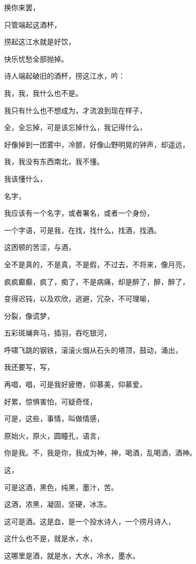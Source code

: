 \documentclass[UTF8]{article}
\begin{document}
\par 换你来罢，
\par 只管端起这酒杯，
\par 捞起这江水就是好饮，
\par 快乐忧愁全部抛掉。
\\[0.6cm]
\par 诗人端起破旧的酒杯，捞这江水，吟：
\\[0.6cm]
\par 我，我，我什么也不是。
\par 我只有什么也不想成为，才流浪到现在样子，
\par 全，全忘掉，可是该忘掉什么，我记得什么，
\par 好像掉到一团雾中，冷颤，好像山野明晃的钟声，却遥远，
\par 我，我没有东西南北，我不懂。
\par 我该懂什么，
\par 名字，
\par 我应该有一个名字，或者署名，或者一个身份，
\par 一个字语，可是我，在找，找什么，找酒，找酒。
\par 这困顿的苦涩，与酒，
\par 全不是真的，不是真，不是假，不过去，不将来，像月亮，
\par 疯疯癫癫，疯了，痴了，不是病痛，却是醉了，醉，醉了，
\par 变得迟钝，以及欢欣，逃避，冗杂，不可理喻，
\par 分裂，像谎梦，
\par 五彩斑斓奔马，插羽，吞吃银河，
\par 呼啸飞跳的钢铁，滚滚火烟从石头的塔顶，鼓动，涌出，
\par 我还要写，写，
\par 再唱，唱，可是我好疲倦，仰慕美，仰慕爱，
\par 好累，惊惧害怕，可疑奇怪，
\par 可是，这些，事情，叫做情感，
\par 原始火，原火，圆瞳孔，语言，
\par 你是我。不，我是你，我成为神，神，喝酒，乱喝酒，酒神。
\par 这，
\par 可是这酒，黑色，纯黑，墨汁，苦。
\par 这酒，浓黑，凝固，坚硬，冰冻。
\par 这可是酒。这是血，是一个投水诗人，一个捞月诗人，
\par 这什么也不是，就是水，水，
\par 这哪里是酒，就是水，大水，冷水，墨水。
\end{document}
